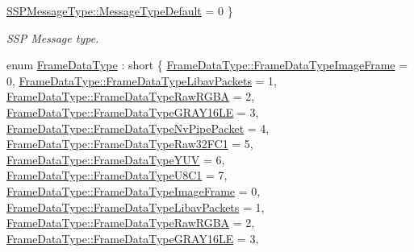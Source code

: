\begin{DoxyCompactItemize}
\hyperlink{namespacemoetsi_1_1ssp_a8948545ffe48a5b3507fd10a1e56d546a16d065ca1ae16532bc3115ec68734080}{S\+S\+P\+Message\+Type\+::\+Message\+Type\+Default} = 0
 \}\begin{DoxyCompactList}\small\item\em S\+SP Message type. \end{DoxyCompactList}
\item 
enum \hyperlink{namespacemoetsi_1_1ssp_aa9b059f0bc7a91855545ee887f2d56c4}{Frame\+Data\+Type} \+: short \{ \newline
\hyperlink{namespacemoetsi_1_1ssp_aa9b059f0bc7a91855545ee887f2d56c4a6f466822a5d24eab84554c0bf415903d}{Frame\+Data\+Type\+::\+Frame\+Data\+Type\+Image\+Frame} = 0, 
\hyperlink{namespacemoetsi_1_1ssp_aa9b059f0bc7a91855545ee887f2d56c4a234b11a09d69865a40eb4db132fe7096}{Frame\+Data\+Type\+::\+Frame\+Data\+Type\+Libav\+Packets} = 1, 
\hyperlink{namespacemoetsi_1_1ssp_aa9b059f0bc7a91855545ee887f2d56c4ac2cdf85544553bda5453b401b79964eb}{Frame\+Data\+Type\+::\+Frame\+Data\+Type\+Raw\+R\+G\+BA} = 2, 
\hyperlink{namespacemoetsi_1_1ssp_aa9b059f0bc7a91855545ee887f2d56c4a44d909233498ad3dec5a3e3e95e908ca}{Frame\+Data\+Type\+::\+Frame\+Data\+Type\+G\+R\+A\+Y16\+LE} = 3, 
\newline
\hyperlink{namespacemoetsi_1_1ssp_aa9b059f0bc7a91855545ee887f2d56c4a1628ff13722acd71d3e90b51c8faa31c}{Frame\+Data\+Type\+::\+Frame\+Data\+Type\+Nv\+Pipe\+Packet} = 4, 
\hyperlink{namespacemoetsi_1_1ssp_aa9b059f0bc7a91855545ee887f2d56c4abb6735708adc6efcecf59e0e1e6c9387}{Frame\+Data\+Type\+::\+Frame\+Data\+Type\+Raw32\+F\+C1} = 5, 
\hyperlink{namespacemoetsi_1_1ssp_aa9b059f0bc7a91855545ee887f2d56c4a6191c61c70f47aa00e2f9251d8ad59fa}{Frame\+Data\+Type\+::\+Frame\+Data\+Type\+Y\+UV} = 6, 
\hyperlink{namespacemoetsi_1_1ssp_aa9b059f0bc7a91855545ee887f2d56c4acd5fc2d48d13ef44a9806046ae34d56b}{Frame\+Data\+Type\+::\+Frame\+Data\+Type\+U8\+C1} = 7, 
\newline
\hyperlink{namespacemoetsi_1_1ssp_aa9b059f0bc7a91855545ee887f2d56c4a6f466822a5d24eab84554c0bf415903d}{Frame\+Data\+Type\+::\+Frame\+Data\+Type\+Image\+Frame} = 0, 
\hyperlink{namespacemoetsi_1_1ssp_aa9b059f0bc7a91855545ee887f2d56c4a234b11a09d69865a40eb4db132fe7096}{Frame\+Data\+Type\+::\+Frame\+Data\+Type\+Libav\+Packets} = 1, 
\hyperlink{namespacemoetsi_1_1ssp_aa9b059f0bc7a91855545ee887f2d56c4ac2cdf85544553bda5453b401b79964eb}{Frame\+Data\+Type\+::\+Frame\+Data\+Type\+Raw\+R\+G\+BA} = 2, 
\hyperlink{namespacemoetsi_1_1ssp_aa9b059f0bc7a91855545ee887f2d56c4a44d909233498ad3dec5a3e3e95e908ca}{Frame\+Data\+Type\+::\+Frame\+Data\+Type\+G\+R\+A\+Y16\+LE} = 3, 

\end{DoxyCompactItemize}
